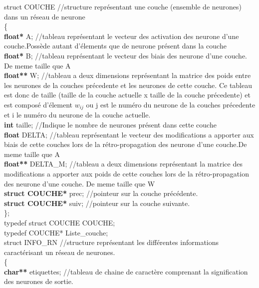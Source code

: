 \documentclass{article}
\newcommand\tab[1][1cm]{\hspace*{#1}}
\begin{document}
	\begin{flushleft}
	
		struct COUCHE	//structure représentant une couche (ensemble de neurones) dans un réseau de neurone\\
		\{\\
			\tab \textcolor{myblue}{\textbf{float*}} A;	//tableau représentant le vecteur des activation des neurone d'une couche.Possède autant d'élements que de neurone présent dans la couche\\
			\tab \textcolor{myblue}{\textbf{float*}} B;	//tableau représentant le vecteur des biais des neurone d'une couche. De meme taille que A\\
			\tab \textcolor{myblue}{\textbf{float**}} W;	//tableau a deux dimensions représentant la matrice des poids entre les neurones de la couches précedente et les neurones de cette couche. Ce tableau est donc de taille (taille de la couche actuelle x taille de la couche précedente) et est composé d'élement $w_{ij}$ ou j est le numéro du neurone de la couches précedente et i le numéro du neurone de la couche actuelle.\\
			\tab \textcolor{myblue}{\textbf{int}} taille;	//Indique le nombre de neurones présent dans cette couche\\
			\tab \textcolor{myblue}{\textbf{float}} DELTA;      //tableau représentant le vecteur des modifications a apporter aux biais de cette couches lors de la rétro-propagation des neurone d'une couche.De meme taille que A\\
			\tab \textcolor{myblue}{\textbf{float**}} DELTA\_M; //tableau a deux dimensions représentant la matrice des modifications a apporter aux poids de cette couches lors de la rétro-propagation des neurone d'une couche. De meme taille que W\\
			\medbreak
			\tab \textcolor{myblue}{\textbf{struct COUCHE*}} prec;	//pointeur sur la couche précédente.\\
			\tab \textcolor{myblue}{\textbf{struct COUCHE*}} suiv;	//pointeur sur la couche suivante.\\
		\};\\
		\bigbreak
		typedef struct COUCHE COUCHE;\\
		typedef COUCHE* Liste\_couche;\\
		\bigbreak
		struct INFO\_RN	//structure représentant les différentes informations caractérisant un réseau de neurones.\\
		\{\\
			\tab \textcolor{myblue}{\textbf{char**}} etiquettes;	//tableau de chaine de caractère comprenant la signification des neurones de sortie.\\

\end{flushleft}
\end{document}
